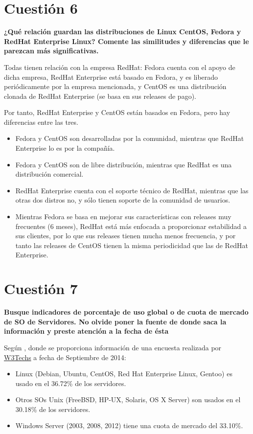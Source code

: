 \documentclass[a4paper,11pt]{article}
\newenvironment{answer}{%
\begin{list}{}{%
\addtolength{\hoffset}{0cm}
}%
\item[]}{\end{list}}
\begin{document}
\section{Cuestión 6}
\textbf{¿Qué relación guardan las distribuciones de Linux CentOS, Fedora y RedHat Enterprise Linux? Comente las 
similitudes y diferencias que le parezcan más significativas.}
\begin{answer}
Todas tienen relación con la empresa RedHat: Fedora cuenta con el apoyo de dicha empresa, RedHat Enterprise está basado
en Fedora, y es liberado periódicamente por la empresa mencionada, y CentOS es una distribución clonada de RedHat Enterprise
(se basa en sus releases de pago).

Por tanto, RedHat Enterprise y CentOS están basados en Fedora, pero hay diferencias entre las tres.
\begin{itemize}
 \item Fedora y CentOS son desarrolladas por la comunidad, mientras que RedHat Enterprise lo es por la compañía.
 \item Fedora y CentOS son de libre distribución, mientras que RedHat es una distribución comercial.
 \item RedHat Enterprise cuenta con el soporte técnico de RedHat, mientras que las otras dos distros no, y sólo tienen
 soporte de la comunidad de usuarios.
 \item Mientras Fedora se basa en mejorar sus características con releases muy frecuentes (6 meses), RedHat está más
 enfocada a proporcionar estabilidad a sus clientes, por lo que sus releases tienen mucha menos frecuencia, y por tanto
 las releases de CentOS tienen la misma periodicidad que las de RedHat Enterprise.
\end{itemize}

\cite{redhat}
\end{answer}

\section{Cuestión 7}
\textbf{Busque indicadores de porcentaje de uso global o de cuota de mercado de SO de Servidores. No olvide poner 
la fuente de donde saca la información y preste atención a la fecha de ésta}
\begin{answer}
  
Según \cite{quota}, donde se proporciona información de una encuesta realizada por \href{http://w3techs.com/}{W3Techs} a fecha de Septiembre de 2014:
\begin{itemize}
  \item Linux (Debian, Ubuntu, CentOS, Red Hat Enterprise Linux, Gentoo) es usado en el 36.72\% de los servidores.
  \item Otros SOs Unix (FreeBSD, HP-UX, Solaris, OS X Server) son usados en el 30.18\% de los servidores.
  \item Windows Server (2003, 2008, 2012) tiene una cuota de mercado del 33.10\%.
\end{itemize}
\end{answer}
\end{document}
